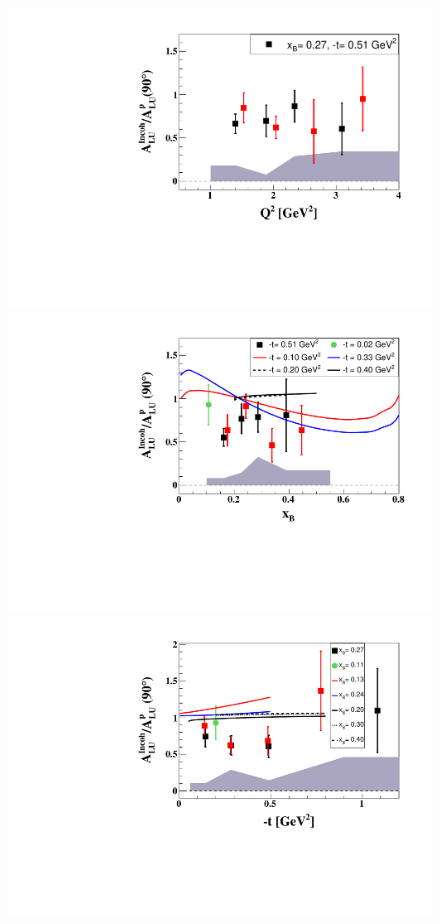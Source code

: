 \begin{figure}[tp]
\centering
\includegraphics[scale=0.52]{4D-incoh-bin/comp_ALU_ratioInc_Q2_shortscenrario.pdf}\\
\includegraphics[scale=0.52]{4D-incoh-bin/comp_ALU_ratioInc_x_shortscenrario.pdf}\\
\includegraphics[scale=0.52]{4D-incoh-bin/comp_ALU_ratioInc_t_shortscenrario.pdf}

\end{figure}
